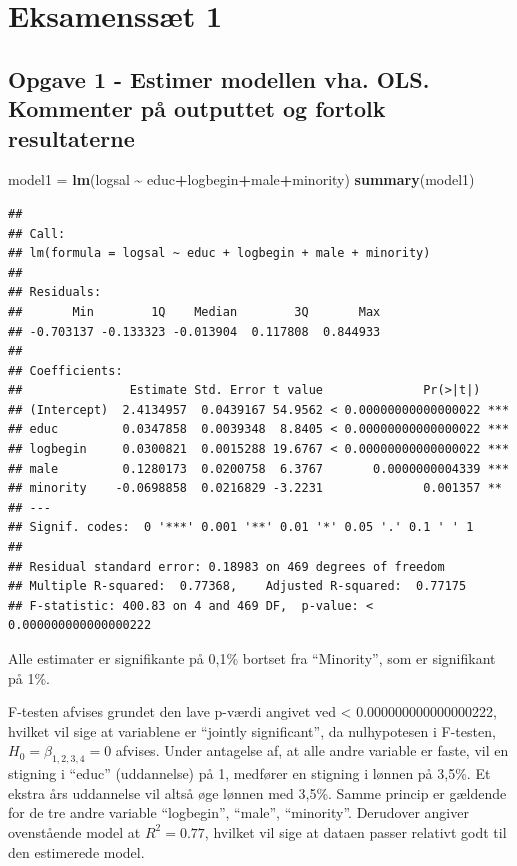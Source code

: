 \documentclass[
]{article}
\author{}
\date{\vspace{-2.5em}}
\newenvironment{Shaded}{\begin{snugshade}}{\end{snugshade}}
\newcommand{\FunctionTok}[1]{\textcolor[rgb]{0.13,0.29,0.53}{\textbf{#1}}}
\newcommand{\NormalTok}[1]{#1}
\newcommand{\OtherTok}[1]{\textcolor[rgb]{0.56,0.35,0.01}{#1}}
\newcommand{\SpecialCharTok}[1]{\textcolor[rgb]{0.81,0.36,0.00}{\textbf{#1}}}
\begin{document}
\hypertarget{eksamenssuxe6t-1}{%
\section{Eksamenssæt 1}\label{eksamenssuxe6t-1}}

\hypertarget{opgave-1---estimer-modellen-vha.-ols.-kommenter-puxe5-outputtet-og-fortolk-resultaterne}{%
\subsection{Opgave 1 - Estimer modellen vha. OLS. Kommenter på outputtet
og fortolk
resultaterne}\label{opgave-1---estimer-modellen-vha.-ols.-kommenter-puxe5-outputtet-og-fortolk-resultaterne}}

\begin{Shaded}
\begin{Highlighting}[]
\NormalTok{model1 }\OtherTok{=} \FunctionTok{lm}\NormalTok{(logsal }\SpecialCharTok{\textasciitilde{}}\NormalTok{ educ}\SpecialCharTok{+}\NormalTok{logbegin}\SpecialCharTok{+}\NormalTok{male}\SpecialCharTok{+}\NormalTok{minority)}
\FunctionTok{summary}\NormalTok{(model1)}
\end{Highlighting}
\end{Shaded}

\begin{verbatim}
## 
## Call:
## lm(formula = logsal ~ educ + logbegin + male + minority)
## 
## Residuals:
##       Min        1Q    Median        3Q       Max 
## -0.703137 -0.133323 -0.013904  0.117808  0.844933 
## 
## Coefficients:
##               Estimate Std. Error t value              Pr(>|t|)    
## (Intercept)  2.4134957  0.0439167 54.9562 < 0.00000000000000022 ***
## educ         0.0347858  0.0039348  8.8405 < 0.00000000000000022 ***
## logbegin     0.0300821  0.0015288 19.6767 < 0.00000000000000022 ***
## male         0.1280173  0.0200758  6.3767       0.0000000004339 ***
## minority    -0.0698858  0.0216829 -3.2231              0.001357 ** 
## ---
## Signif. codes:  0 '***' 0.001 '**' 0.01 '*' 0.05 '.' 0.1 ' ' 1
## 
## Residual standard error: 0.18983 on 469 degrees of freedom
## Multiple R-squared:  0.77368,    Adjusted R-squared:  0.77175 
## F-statistic: 400.83 on 4 and 469 DF,  p-value: < 0.000000000000000222
\end{verbatim}

Alle estimater er signifikante på 0,1\% bortset fra ``Minority'', som er
signifikant på 1\%.

F-testen afvises grundet den lave p-værdi angivet ved \textless{}
0.000000000000000222, hvilket vil sige at variablene er ``jointly
significant'', da nulhypotesen i F-testen, \(H_0 = \beta_{1,2,3,4} = 0\)
afvises. Under antagelse af, at alle andre variable er faste, vil en
stigning i ``educ'' (uddannelse) på 1, medfører en stigning i lønnen på
3,5\%. Et ekstra års uddannelse vil altså øge lønnen med 3,5\%. Samme
princip er gældende for de tre andre variable ``logbegin'', ``male'',
``minority''. Derudover angiver ovenstående model at \(R^2 = 0.77\),
hvilket vil sige at dataen passer relativt godt til den estimerede
model.
\end{document}
